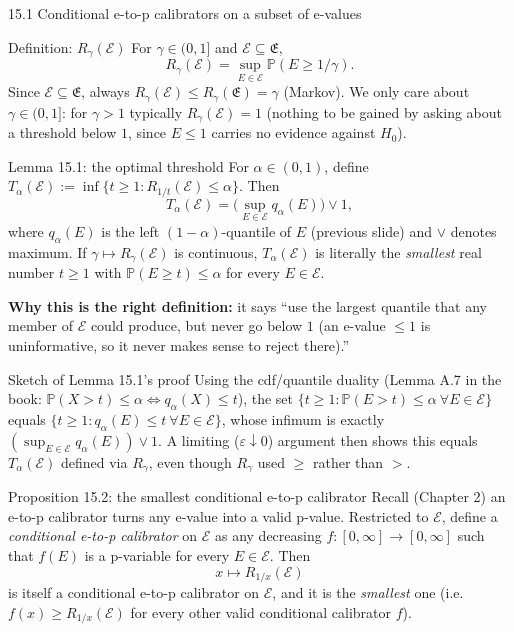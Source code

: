 \documentclass[aspectratio=169,10pt]{beamer}
\newcommand{\PP}{\mathbb{P}}
\newcommand{\calE}{\mathcal{E}}
\newcommand{\frakE}{\mathfrak{E}}
\begin{document}
\begin{frame}[allowframebreaks]{15.1 Conditional e-to-p calibrators on a subset of e-values}
  \begin{block}{Definition: $R_\gamma(\calE)$}
    For $\gamma\in(0,1]$ and $\calE\subseteq\frakE$,
    \[
      R_\gamma(\calE) = \sup_{E\in\calE}\PP(E\ge1/\gamma).
    \]
    Since $\calE\subseteq\frakE$, always $R_\gamma(\calE)\le R_\gamma(\frakE)=\gamma$ (Markov). We only care about $\gamma\in(0,1]$: for $\gamma>1$ typically $R_\gamma(\calE)=1$ (nothing to be gained by asking about a threshold below $1$, since $E\le1$ carries no evidence against $H_0$).
  \end{block}

  \begin{block}{Lemma 15.1: the optimal threshold}
    For $\alpha\in(0,1)$, define $T_\alpha(\calE):=\inf\{t\ge1 : R_{1/t}(\calE)\le\alpha\}$. Then
    \[
      T_\alpha(\calE) = \Big(\sup_{E\in\calE} q_\alpha(E)\Big)\vee 1,
    \]
    where $q_\alpha(E)$ is the left $(1-\alpha)$-quantile of $E$ (previous slide) and $\vee$ denotes maximum. If $\gamma\mapsto R_\gamma(\calE)$ is continuous, $T_\alpha(\calE)$ is literally the \emph{smallest} real number $t\ge1$ with $\PP(E\ge t)\le\alpha$ for every $E\in\calE$.
  \end{block}

  \textbf{Why this is the right definition:} it says ``use the largest quantile that any member of $\calE$ could produce, but never go below $1$ (an e-value $\le1$ is uninformative, so it never makes sense to reject there).''

  \framebreak

  \begin{block}{Sketch of Lemma 15.1's proof}
    Using the cdf/quantile duality (Lemma A.7 in the book: $\PP(X>t)\le\alpha \iff q_\alpha(X)\le t$), the set $\{t\ge1 : \PP(E>t)\le\alpha\ \forall E\in\calE\}$ equals $\{t\ge1 : q_\alpha(E)\le t\ \forall E\in\calE\}$, whose infimum is exactly $(\sup_{E\in\calE}q_\alpha(E))\vee1$. A limiting ($\varepsilon\downarrow0$) argument then shows this equals $T_\alpha(\calE)$ defined via $R_\gamma$, even though $R_\gamma$ used $\ge$ rather than $>$.
  \end{block}

  \begin{block}{Proposition 15.2: the smallest conditional e-to-p calibrator}
    Recall (Chapter 2) an e-to-p calibrator turns any e-value into a valid p-value. Restricted to $\calE$, define a \emph{conditional e-to-p calibrator} on $\calE$ as any decreasing $f:[0,\infty]\to[0,\infty]$ such that $f(E)$ is a p-variable for every $E\in\calE$. Then
    \[
      x \mapsto R_{1/x}(\calE)
    \]
    is itself a conditional e-to-p calibrator on $\calE$, and it is the \emph{smallest} one (i.e.\ $f(x)\ge R_{1/x}(\calE)$ for every other valid conditional calibrator $f$).
  \end{block}


\end{frame}
\end{document}
